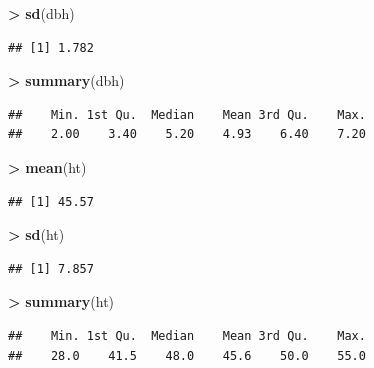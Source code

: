\documentclass[]{krantz}
\makeatletter
\newenvironment{Shaded}{\begin{snugshade}}{\end{snugshade}}
\newcommand{\KeywordTok}[1]{\textcolor[rgb]{0.27,0.27,0.27}{\textbf{#1}}}
\newcommand{\StringTok}[1]{\textcolor[rgb]{0.5,0.5,0.5}{#1}}
\newcommand{\OperatorTok}[1]{\textcolor[rgb]{0.43,0.43,0.43}{\textbf{#1}}}
\newcommand{\NormalTok}[1]{#1}
\newenvironment{kframe}{%
\medskip{}
\setlength{\fboxsep}{.8em}
 \def\at@end@of@kframe{}%
 \ifinner\ifhmode%
  \def\at@end@of@kframe{\end{minipage}}%
  \begin{minipage}{\columnwidth}%
 \fi\fi%
 \def\FrameCommand##1{\hskip\@totalleftmargin \hskip-\fboxsep
 \colorbox{shadecolor}{##1}\hskip-\fboxsep
     \hskip-\linewidth \hskip-\@totalleftmargin \hskip\columnwidth}%
 \MakeFramed {\advance\hsize-\width
   \@totalleftmargin\z@ \linewidth\hsize
   \@setminipage}}%
 {\par\unskip\endMakeFramed%
 \at@end@of@kframe}
\renewenvironment{Shaded}{\begin{kframe}}{\end{kframe}}
\theoremstyle{definition}
\theoremstyle{definition}
\theoremstyle{definition}
\theoremstyle{remark}
\makeatother
\begin{document}
\begin{Shaded}
\begin{Highlighting}[]
\OperatorTok{>}\StringTok{ }\KeywordTok{sd}\NormalTok{(dbh)}
\end{Highlighting}
\end{Shaded}

\begin{verbatim}
## [1] 1.782
\end{verbatim}

\begin{Shaded}
\begin{Highlighting}[]
\OperatorTok{>}\StringTok{ }\KeywordTok{summary}\NormalTok{(dbh)}
\end{Highlighting}
\end{Shaded}

\begin{verbatim}
##    Min. 1st Qu.  Median    Mean 3rd Qu.    Max. 
##    2.00    3.40    5.20    4.93    6.40    7.20
\end{verbatim}

\begin{Shaded}
\begin{Highlighting}[]
\OperatorTok{>}\StringTok{ }\KeywordTok{mean}\NormalTok{(ht)}
\end{Highlighting}
\end{Shaded}

\begin{verbatim}
## [1] 45.57
\end{verbatim}

\begin{Shaded}
\begin{Highlighting}[]
\OperatorTok{>}\StringTok{ }\KeywordTok{sd}\NormalTok{(ht)}
\end{Highlighting}
\end{Shaded}

\begin{verbatim}
## [1] 7.857
\end{verbatim}

\begin{Shaded}
\begin{Highlighting}[]
\OperatorTok{>}\StringTok{ }\KeywordTok{summary}\NormalTok{(ht)}
\end{Highlighting}
\end{Shaded}

\begin{verbatim}
##    Min. 1st Qu.  Median    Mean 3rd Qu.    Max. 
##    28.0    41.5    48.0    45.6    50.0    55.0
\end{verbatim}
\end{document}
